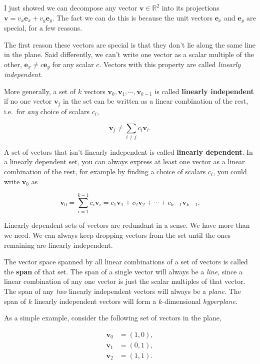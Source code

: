 \documentclass[
  letterpaper,
  DIV=11,
  numbers=noendperiod]{scrreprt}
\begin{document}
I just showed we can decompose any vector
\(\mathbf{v} \in \mathbb{R}^2\) into its projections
\(\mathbf{v} = v_x \mathbf{e}_x + v_y \mathbf{e}_y\). The fact we can do
this is because the unit vectors \(\mathbf{e}_x\) and \(\mathbf{e}_y\)
are special, for a few reasons.

The first reason these vectors are special is that they don't lie along
the same line in the plane. Said differently, we can't write one vector
as a scalar multiple of the other, \(\mathbf{e}_x \neq c \mathbf{e}_y\)
for any scalar \(c\). Vectors with this property are called
\emph{linearly independent}.

More generally, a set of \(k\) vectors
\(\mathbf{v}_0, \mathbf{v}_1, \cdots, \mathbf{v}_{k-1}\) is called
\textbf{linearly independent} if no one vector \(\mathbf{v}_j\) in the
set can be written as a linear combination of the rest, i.e.~for
\emph{any} choice of scalars \(c_i\),

\[\mathbf{v}_j \neq \sum_{i \neq j} c_i \mathbf{v}_i.\]

A set of vectors that isn't linearly independent is called
\textbf{linearly dependent}. In a linearly dependent set, you can always
express at least one vector as a linear combination of the rest, for
example by finding a choice of scalars \(c_i\), you could write
\(\mathbf{v}_0\) as

\[\mathbf{v}_0 = \sum_{i=1}^{k-1} c_i \mathbf{v}_i = c_1 \mathbf{v}_1 + c_2 \mathbf{v}_2 + \cdots + c_{k-1} \mathbf{v}_{k-1}.\]

Linearly dependent sets of vectors are redundant in a sense. We have
more than we need. We can always keep dropping vectors from the set
until the ones remaining are linearly independent.

The vector space spanned by all linear combinations of a set of vectors
is called the \textbf{span} of that set. The span of a single vector
will always be a \emph{line}, since a linear combination of any one
vector is just the scalar multiples of that vector. The span of any
\emph{two} linearly independent vectors will always be a \emph{plane}.
The span of \(k\) linearly independent vectors will form a
\(k\)-dimensional \emph{hyperplane}.

As a simple example, consider the following set of vectors in the plane,

\begin{align*}
\mathbf{v}_0 &= (1, 0), \\
\mathbf{v}_1 &= (0, 1), \\
\mathbf{v}_2 &= (1, 1).
\end{align*}
\end{document}
